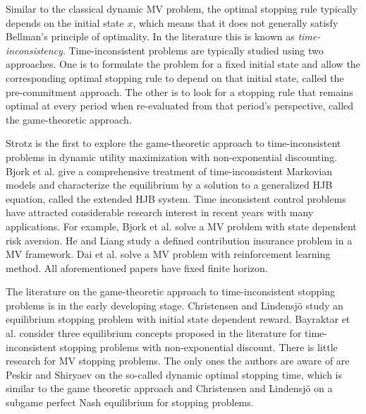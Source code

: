 \documentclass[11pt]{article}
\begin{document}
Similar to the classical dynamic MV problem, the optimal stopping rule  typically depends on the initial state $x$, which means that it does not generally satisfy Bellman’s principle of optimality. In the literature this is known as {\it time-inconsistency}. Time-inconsistent problems are typically studied using two  approaches. One is to formulate the problem for a fixed initial state and allow the corresponding optimal stopping rule to depend on that initial state, called the pre-commitment approach. The other is to look for a stopping rule that remains optimal at every period when re-evaluated from that period's perspective, called the game-theoretic approach.


Strotz \cite{strotz1955myopia} is the first to explore the game-theoretic approach to time-inconsistent problems in dynamic utility maximization with non-exponential discounting. Bjork et al. \cite{bjork2021time} give a comprehensive treatment of time-inconsistent Markovian models   and characterize the  equilibrium by a solution to a generalized HJB equation, called the extended HJB system.  Time inconsistent control problems have attracted considerable research interest  in recent years with many applications. For example,  Bjork et al. \cite{bjork2014mean} solve a MV problem with state dependent risk aversion. He and Liang \cite{he2013optimal} study a defined contribution insurance problem in a MV framework. Dai et al. \cite{dai2023learning} solve a MV problem with reinforcement learning method. 
All aforementioned papers have fixed finite horizon. 


The literature on the game-theoretic approach to time-inconsistent stopping problems is in the early developing stage. Christensen and Lindensj\"o \cite{christensen2018finding}  study an equilibrium stopping problem with initial state dependent   reward.  Bayraktar et al. \cite{bayraktar2023equilibria} consider three equilibrium concepts proposed in  the literature for time-inconsistent stopping problems with non-exponential discount. 
There is little research   for MV stopping problems.  The only ones the authors are aware of are Peskir and Shiryaev  \cite{peskir2006optimal} on the so-called dynamic optimal stopping time, which is similar to the game theoretic approach and  Christensen and Lindensj\"o \cite{christensen2020time} on a subgame perfect Nash equilibrium for stopping problems. 
\end{document}
